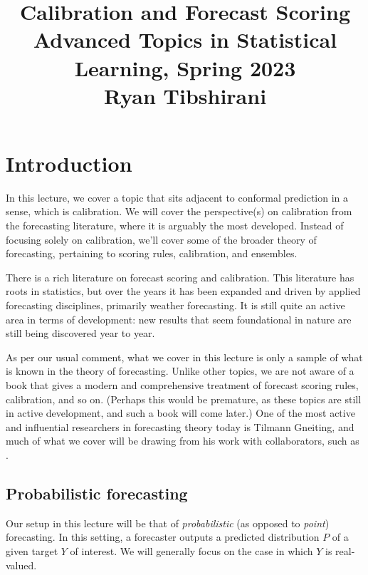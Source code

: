 \documentclass{article}
\title{Calibration and Forecast Scoring \\ \smallskip
\large Advanced Topics in Statistical Learning, Spring 2023 \\ \smallskip
Ryan Tibshirani }
\date{}
\begin{document}
\maketitle
\RaggedRight
\vspace{-50pt}

\section{Introduction}

In this lecture, we cover a topic that sits adjacent to conformal prediction in
a sense, which is calibration. We will cover the perspective(s) on calibration 
from the forecasting literature, where it is arguably the most developed. 
Instead of focusing solely on calibration, we'll cover some of the broader
theory of forecasting, pertaining to scoring rules, calibration, and ensembles.     

There is a rich literature on forecast scoring and calibration. This literature
has roots in statistics, but over the years it has been expanded and driven by
applied forecasting disciplines, primarily weather forecasting. It is still
quite an active area in terms of development: new results that seem foundational
in nature are still being discovered year to year.  

As per our usual comment, what we cover in this lecture is only a sample of what
is known in the theory of forecasting. Unlike other topics, we are not aware of
a book that gives a modern and comprehensive treatment of forecast scoring
rules, calibration, and so on. (Perhaps this would be premature, as these topics
are still in active development, and such a book will come later.) One of the
most active and influential researchers in forecasting theory today is Tilmann
Gneiting, and much of what we cover will be drawing from his work with
collaborators, such as \citet{gneiting2007strictly, gneiting2007probabilistic,
    ranjan2010combining, gneiting2013combining}.

\subsection{Probabilistic forecasting}

Our setup in this lecture will be that of \emph{probabilistic} (as opposed to
\emph{point}) forecasting. In this setting, a forecaster outputs a predicted
distribution $P$ of a given target $Y$ of interest. We will generally focus on
the case in which $Y$ is real-valued.
\end{document}
